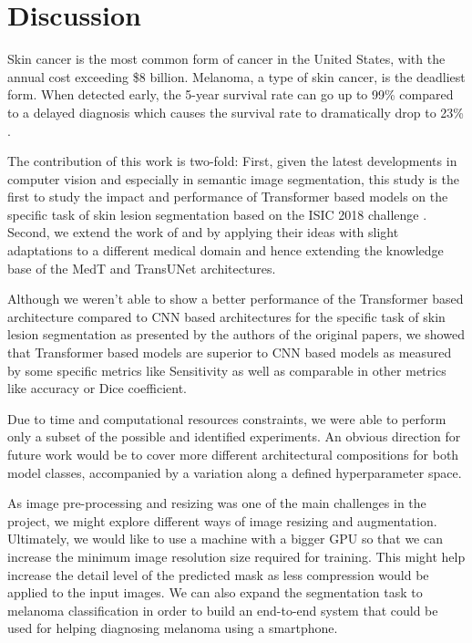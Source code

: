 \section{Discussion}

Skin cancer is the most common form of cancer in the United States, with the annual cost exceeding \$8 billion. Melanoma, a type of skin cancer, is the deadliest form. When detected early, the 5-year survival rate can go up to 99\% compared to a delayed diagnosis which causes the survival rate to dramatically drop to 23\% \citep{challenge-2018-codella}.

\par
The contribution of this work is two-fold: First, given the latest developments in computer vision and especially in semantic image segmentation, this study is the first to study the impact and performance of Transformer based models \citep{transformers-2020-dosovitskiy} on the specific task of skin lesion segmentation based on the ISIC 2018 challenge \citep{isic-2018-segmentation}. Second, we extend the work of \citep{medical_transformer-2021-valanarasu} and \citep{transunet-2021-chen} by applying their ideas with slight adaptations to a different medical domain and hence extending the knowledge base of the MedT and TransUNet architectures.

\par
Although we weren’t able to show a better performance of the Transformer based architecture compared to CNN based architectures for the specific task of skin lesion segmentation as presented by the authors of the original papers, we showed that Transformer based models are superior to CNN based models as measured by some specific metrics like Sensitivity as well as comparable in other metrics like accuracy or Dice coefficient.

\par
Due to time and computational resources constraints, we were able to perform only a subset of the possible and identified experiments. An obvious direction for future work would be to cover more different architectural compositions for both model classes, accompanied by a variation along a defined  hyperparameter space.

\par
As image pre-processing and resizing was one of the main challenges in the project, we might explore different ways of image resizing and augmentation. Ultimately, we would like to use a machine with a bigger GPU so that we can increase the minimum image resolution size required for training. This might help increase the detail level of the predicted mask as less compression would be applied to the input images. We can also expand the segmentation task to melanoma classification in order to build an end-to-end system that could be used for helping diagnosing melanoma using a smartphone.


